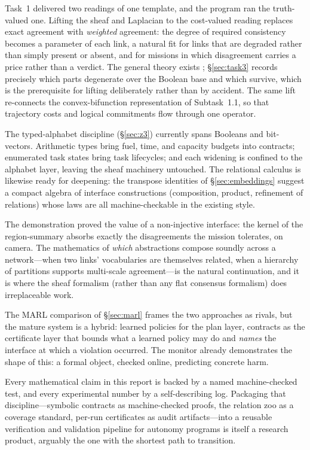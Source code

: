 \documentclass[11pt]{article}
\theoremstyle{definition}
\theoremstyle{remark}
\begin{document}
\begin{description}[leftmargin=1.6em, style=nextline]
\item[The cost-valued lift.]
Task~1 delivered two readings of one template, and the program ran the truth-valued one.
Lifting the sheaf and Laplacian to the cost-valued reading replaces exact agreement with
\emph{weighted} agreement: the degree of required consistency becomes a parameter of each
link, a natural fit for links that are degraded rather than simply present or absent, and for
missions in which disagreement carries a price rather than a verdict.
The general theory exists \citep{ghristCategoricalDiffusionWeighted2026}; \S\ref{sec:task3}
records precisely which parts degenerate over the Boolean base and which survive, which is the
prerequisite for lifting deliberately rather than by accident.
The same lift re-connects the convex-bifunction representation of Subtask~1.1, so that
trajectory costs and logical commitments flow through one operator.
\item[Richer interface types.]
The typed-alphabet discipline (\S\ref{sec:z3}) currently spans Booleans and bit-vectors.
Arithmetic types bring fuel, time, and capacity budgets into contracts; enumerated task states
bring task lifecycles; and each widening is confined to the alphabet layer, leaving the sheaf
machinery untouched.
The relational calculus is likewise ready for deepening: the transpose identities of
\S\ref{sec:embeddings} suggest a compact algebra of interface constructions (composition,
product, refinement of relations) whose laws are all machine-checkable in the existing style.
\item[Abstraction as a first-class object.]
The demonstration proved the value of a non-injective interface: the kernel of the
region-summary absorbs exactly the disagreements the mission tolerates, on camera.
The mathematics of \emph{which} abstractions compose soundly across a network---when two
links' vocabularies are themselves related, when a hierarchy of partitions supports multi-scale
agreement---is the natural continuation, and it is where the sheaf formalism (rather than any
flat consensus formalism) does irreplaceable work.
\item[Contracts and learning, together.]
The MARL comparison of \S\ref{sec:marl} frames the two approaches as rivals, but the mature
system is a hybrid: learned policies for the plan layer, contracts as the certificate layer
that bounds what a learned policy may do and \emph{names} the interface at which a violation
occurred.
The monitor already demonstrates the shape of this: a formal object, checked online, predicting
concrete harm.
\item[Assurance as a product.]
Every mathematical claim in this report is backed by a named machine-checked test, and every
experimental number by a self-describing log.
Packaging that discipline---symbolic contracts as machine-checked proofs, the relation zoo as a
coverage standard, per-run certificates as audit artifacts---into a reusable verification and
validation pipeline for autonomy programs is itself a research product, arguably the one with
the shortest path to transition.
\end{description}
\end{document}
